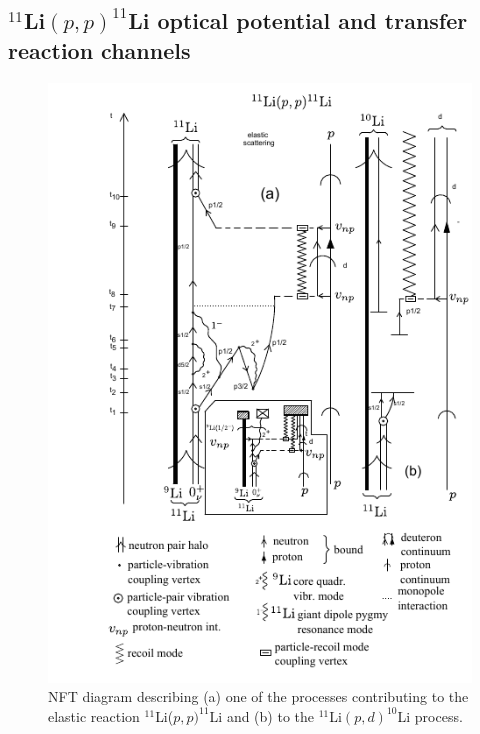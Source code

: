 \subsection{$^{11}$Li$(p,p)^{11}$Li optical potential and transfer reaction channels}
     \begin{figure}
     \centerline {
     \includegraphics*[width=15cm]{introduccion/figs/fig1_9_2x}
     }
     \caption{NFT diagram describing (a) one of the processes contributing to the elastic reaction $^{11}$Li($p,p)^{11}$Li and (b) to the $^{11}$Li$(p,d)^{10}$Li process.}
     \label{fig1.9.2}
     \end{figure}
